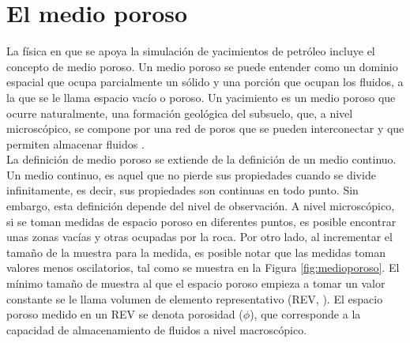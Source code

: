 \section{El medio poroso}\label{sec:porousmedium}

La física en que se apoya la simulación de yacimientos de petróleo incluye el concepto de medio poroso. Un medio poroso se puede entender como un dominio espacial que ocupa parcialmente un sólido y una porción que ocupan los fluidos, a la que se le llama espacio vacío o poroso. Un yacimiento es un medio poroso que ocurre naturalmente, una formación geológica del subsuelo, que, a nivel microscópico, se compone por una red de poros que se pueden interconectar y que permiten almacenar fluidos \citep{Bear2018}.\\

La definición de medio poroso se extiende de la definición de un medio continuo. Un medio continuo, es aquel que no pierde sus propiedades cuando se divide infinitamente, es decir, sus propiedades son continuas en todo punto. Sin embargo, esta definición depende del nivel de observación. A nivel microscópico, si se toman medidas de espacio poroso en diferentes puntos, es posible encontrar unas zonas vacías y otras ocupadas por la roca. Por otro lado, al incrementar el tamaño de la muestra para la medida, es posible notar que las medidas toman valores menos oscilatorios, tal como se muestra en la Figura \ref{fig:medioporoso}. El mínimo tamaño de muestra al que el espacio poroso empieza a tomar un valor constante se le llama volumen de elemento representativo (REV, \cite{Bear2018}). El espacio poroso medido en un REV se denota porosidad ($\phi$), que corresponde a la capacidad de almacenamiento de fluidos a nivel macroscópico.\\

